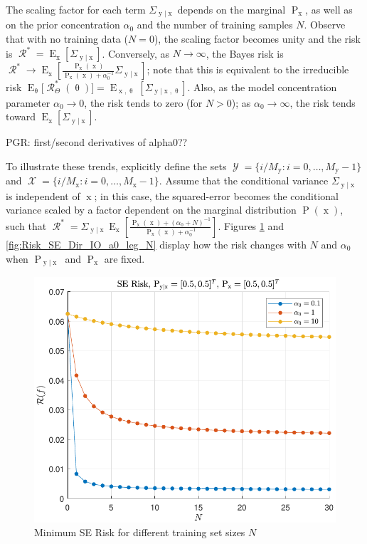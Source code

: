 \documentclass[12pt]{article}
\DeclareMathOperator{\xrm}{\mathrm{x}}
\DeclareMathOperator{\yrm}{\mathrm{y}}
\DeclareMathOperator{\Prm}{\mathrm{P}}
\DeclareMathOperator{\Erm}{\mathrm{E}}
\DeclareMathOperator{\Xcal}{\mathcal{X}}
\DeclareMathOperator{\Ycal}{\mathcal{Y}}
\DeclareMathOperator{\Rcal}{\mathcal{R}}
\begin{document}
The scaling factor for each term $\Sigma_{\yrm | \xrm}$ depends on the marginal $\Prm_{\xrm}$, as well as on the prior concentration $\alpha_0$ and the number of training samples $N$. Observe that with no training data ($N = 0$), the scaling factor becomes unity and the risk is $\Rcal^* = \Erm_{\xrm} \left[ \Sigma_{\yrm | \xrm} \right]$. Conversely, as $N \to \infty$, the Bayes risk is $\Rcal^* \to \Erm_{\xrm} \left[ \frac{\Prm_{\xrm}(\xrm)}{\Prm_{\xrm}(\xrm) + \alpha_0^{-1}} \Sigma_{\yrm | \xrm} \right]$; note that this is equivalent to the irreducible risk $\Erm_{\uptheta}\big[\Rcal_{\Theta}^*(\uptheta)\big] = \Erm_{\xrm,\uptheta} \left[ \Sigma_{\yrm | \xrm,\uptheta} \right]$. Also, as the model concentration parameter $\alpha_0 \to 0$, the risk tends to zero (for $N > 0$); as $\alpha_0 \to \infty$, the risk tends toward $\Erm_{\xrm} \left[ \Sigma_{\yrm | \xrm} \right]$.

PGR: first/second derivatives of alpha0??

To illustrate these trends, explicitly define the sets $\Ycal = \{ i/M_{\yrm} : i = 0,\ldots,M_{\yrm}-1 \}$ and $\Xcal = \{ i/M_{\xrm} : i = 0,\ldots,M_{\xrm}-1 \}$. Assume that the conditional variance $\Sigma_{\yrm | \xrm}$ is independent of $\xrm$; in this case, the squared-error becomes the conditional variance scaled by a factor dependent on the marginal distribution $\Prm(\xrm)$, such that $\Rcal^* = \Sigma_{\yrm | \xrm} \Erm_{\xrm} \left[ \frac{\Prm_{\xrm}(\xrm) + (\alpha_0+N)^{-1}}{\Prm_{\xrm}(\xrm) + \alpha_0^{-1}} \right]$.  Figures \ref{fig:Risk_SE_Dir_IO_N_leg_a0} and \ref{fig:Risk_SE_Dir_IO_a0_leg_N} display how the risk changes with $N$ and $\alpha_0$ when $\Prm_{\yrm | \xrm}$ and $\Prm_{\xrm}$ are fixed.

\begin{figure}
\centering
\includegraphics[width=0.7\linewidth]{Risk_SE_Dir_IO_N_leg_a0.pdf}
\caption{Minimum SE Risk for different training set sizes $N$}
\label{fig:Risk_SE_Dir_IO_N_leg_a0}
\end{figure}
\end{document}
